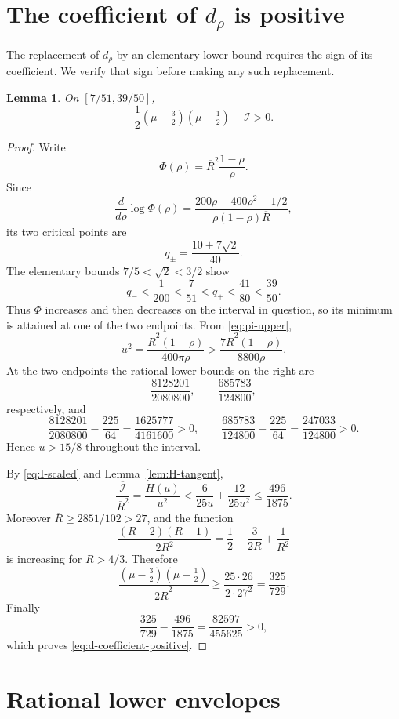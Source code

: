 \documentclass[11pt]{article}
\newtheorem{lemma}[theorem]{Lemma}
\newcommand{\Ibar}{\overline{\mathcal I}}
\newcommand{\Rbar}{\overline R}
\begin{document}
\section{The coefficient of \(d_\rho\) is positive}

The replacement of \(d_\rho\) by an elementary lower bound requires the
sign of its coefficient.  We verify that sign before making any such
replacement.

\begin{lemma}
\label{lem:d-coefficient}
On \([7/51,39/50]\),
\begin{equation}
 \frac12(\mu-\tfrac32)(\mu-\tfrac12)-\Ibar>0.
 \label{eq:d-coefficient-positive}
\end{equation}
\end{lemma}

\begin{proof}
Write
\[
 \Phi(\rho)=\Rbar^2\frac{1-\rho}{\rho}.
\]
Since
\[
 \frac{d}{d\rho}\log\Phi(\rho)
 =\frac{200\rho-400\rho^2-1/2}
        {\rho(1-\rho)\Rbar},
\]
its two critical points are
\[
       q_\pm=\frac{10\pm7\sqrt2}{40}.
\]
The elementary bounds \(7/5<\sqrt2<3/2\) show
\[
 q_-<\frac1{200}<\frac7{51}<q_+<\frac{41}{80}<\frac{39}{50}.
\]
Thus \(\Phi\) increases and then decreases on the interval in question,
so its minimum is attained at one of the two endpoints.  From
\eqref{eq:pi-upper},
\[
 u^2=\frac{\Rbar^2(1-\rho)}{400\pi\rho}
 >\frac{7\Rbar^2(1-\rho)}{8800\rho}.
\]
At the two endpoints the rational lower bounds on the right are
\[
 \frac{8128201}{2080800},
 \qquad
 \frac{685783}{124800},
\]
respectively, and
\[
 \frac{8128201}{2080800}-\frac{225}{64}
 =\frac{1625777}{4161600}>0,
 \qquad
 \frac{685783}{124800}-\frac{225}{64}
 =\frac{247033}{124800}>0.
\]
Hence \(u>15/8\) throughout the interval.

By \eqref{eq:I-scaled} and Lemma~\ref{lem:H-tangent},
\[
 \frac{\Ibar}{\Rbar^2}
 =\frac{H(u)}{u^2}
 <\frac6{25u}+\frac{12}{25u^2}
 \leq\frac{496}{1875}.
\]
Moreover \(\Rbar\geq2851/102>27\), and the function
\[
 \frac{(R-2)(R-1)}{2R^2}
 =\frac12-\frac{3}{2R}+\frac1{R^2}
\]
is increasing for \(R>4/3\).  Therefore
\[
 \frac{(\mu-\tfrac32)(\mu-\tfrac12)}{2\Rbar^2}
 \geq\frac{25\cdot26}{2\cdot27^2}
 =\frac{325}{729}.
\]
Finally
\[
       \frac{325}{729}-\frac{496}{1875}
       =\frac{82597}{455625}>0,
\]
which proves \eqref{eq:d-coefficient-positive}.
\end{proof}

\section{Rational lower envelopes}
\end{document}
